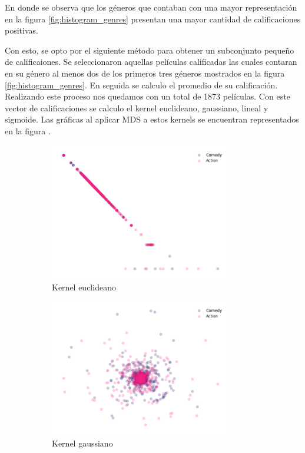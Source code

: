 En donde se observa que los géneros que contaban con una mayor representación en la figura \ref{fig:histogram_genres} presentan una mayor cantidad de calificaciones positivas.

Con esto, se opto por el siguiente método para obtener un subconjunto pequeño de calificaiones. Se seleccionaron aquellas películas calificadas las cuales contaran en su género al menos dos de los primeros tres géneros mostrados en la figura \ref{fig:histogram_genres}. En seguida se calculo el promedio de su calificación. Realizando este proceso nos quedamos con un total de 1873 películas. Con este vector de calificaciones se calculo el kernel euclideano, gaussiano, lineal y sigmoide. Las gráficas al aplicar MDS a estos kernels se encuentran representados en la figura .

\begin{figure}[H]
    \centering
    \begin{subfigure}{8cm}
        \includegraphics[width=8cm]{Graphics/Problema_3_2/MDS_euclidean.png}
        \caption{Kernel euclideano}
    \end{subfigure}
    \begin{subfigure}{8cm}
        \includegraphics[width=8cm]{Graphics/Problema_3_2/MDS_gaussian.png}
        \caption{Kernel gaussiano}
    \end{subfigure}
    \begin{subfigure}{8cm}

\end{subfigure}
\end{figure}
